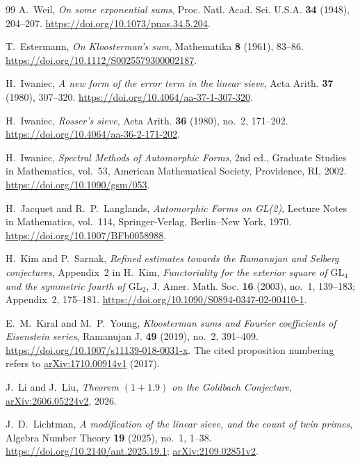 \begin{thebibliography}{99}
A.~Weil, \emph{On some exponential sums},
Proc. Natl. Acad. Sci. U.S.A. \textbf{34} (1948), 204--207.
\url{https://doi.org/10.1073/pnas.34.5.204}.

T.~Estermann, \emph{On Kloosterman's sum},
Mathematika \textbf{8} (1961), 83--86.
\url{https://doi.org/10.1112/S0025579300002187}.

H.~Iwaniec, \emph{A new form of the error term in the linear sieve},
Acta Arith. \textbf{37} (1980), 307--320.
\url{https://doi.org/10.4064/aa-37-1-307-320}.

H.~Iwaniec, \emph{Rosser's sieve}, Acta Arith. \textbf{36} (1980),
no.~2, 171--202.
\url{https://doi.org/10.4064/aa-36-2-171-202}.

H.~Iwaniec, \emph{Spectral Methods of Automorphic Forms}, 2nd ed.,
Graduate Studies in Mathematics, vol.~53, American Mathematical Society,
Providence, RI, 2002.
\url{https://doi.org/10.1090/gsm/053}.

H.~Jacquet and R.~P.~Langlands,
\emph{Automorphic Forms on GL(2)}, Lecture Notes in Mathematics,
vol.~114, Springer-Verlag, Berlin--New York, 1970.
\url{https://doi.org/10.1007/BFb0058988}.

H.~Kim and P.~Sarnak, \emph{Refined estimates towards the Ramanujan and
Selberg conjectures}, Appendix~2 in H.~Kim, \emph{Functoriality for the
exterior square of $\mathrm{GL}_4$ and the symmetric fourth of
$\mathrm{GL}_2$}, J. Amer. Math. Soc. \textbf{16} (2003), no.~1, 139--183;
Appendix~2, 175--181.
\url{https://doi.org/10.1090/S0894-0347-02-00410-1}.

E.~M.~K{\i}ral and M.~P.~Young, \emph{Kloosterman sums and Fourier
coefficients of Eisenstein series}, Ramanujan J. \textbf{49} (2019),
no.~2, 391--409.
\url{https://doi.org/10.1007/s11139-018-0031-x}.
The cited proposition numbering refers to
\href{https://arxiv.org/abs/1710.00914v1}{arXiv:1710.00914v1} (2017).

J.~Li and J.~Liu, \emph{Theorem $(1+1.9)$ on the Goldbach Conjecture},
\href{https://arxiv.org/abs/2606.05224v2}{arXiv:2606.05224v2}, 2026.

J.~D.~Lichtman, \emph{A modification of the linear sieve, and the count of
twin primes}, Algebra Number Theory \textbf{19} (2025), no.~1, 1--38.
\url{https://doi.org/10.2140/ant.2025.19.1};
\href{https://arxiv.org/abs/2109.02851v2}{arXiv:2109.02851v2}.


\end{thebibliography}
